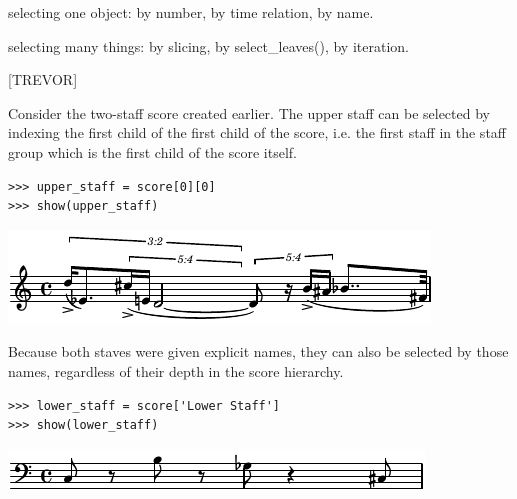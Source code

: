 \documentclass{article}
\begin{document}
selecting one object: by number, by time relation, by name.

selecting many things: by slicing, by select\_leaves(), by iteration.

[TREVOR]


Consider the two-staff score created earlier. The upper staff can be selected
by indexing the first child of the first child of the score, i.e. the first
staff in the staff group which is the first child of the score itself.

\begin{lstlisting}
>>> upper_staff = score[0][0]
>>> show(upper_staff)
\end{lstlisting}

\noindent\includegraphics[scale=1.0]{images/abjad-7.pdf}


Because both staves were given explicit names, they can also be selected by
those names, regardless of their depth in the score hierarchy.

\begin{lstlisting}
>>> lower_staff = score['Lower Staff']
>>> show(lower_staff)
\end{lstlisting}

\noindent\includegraphics[scale=1.0]{images/abjad-8.pdf}
\end{document}
